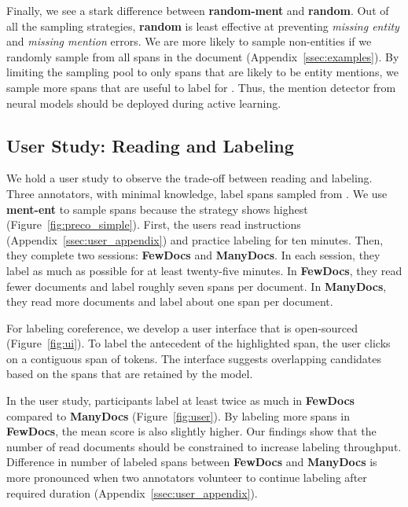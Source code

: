 Finally, we see a stark difference between \textbf{random-ment} and \textbf{random}.
Out of all the sampling strategies, \textbf{random} is least effective at preventing \emph{missing entity} and \emph{missing mention} errors.
We are more likely to sample non-entities if we randomly sample from all spans in the document (Appendix~\ref{ssec:examples}).
By limiting the sampling pool to only spans that are likely to be entity mentions, we sample more spans that are useful to label for \coref{}.  Thus, the mention detector from neural models should be deployed during active learning.




\subsection{User Study: Reading and Labeling}
\label{ssec:human_labeling}


We hold a user study to observe the trade-off between reading and labeling.
Three annotators, with minimal  knowledge, label spans
sampled from \preco{}. We use \textbf{ment-ent} to sample spans because the
strategy shows highest \avgfone{} (Figure~\ref{fig:preco_simple}).
First, the users read instructions (Appendix~\ref{ssec:user_appendix}) and practice labeling for
ten minutes.
Then, they complete two sessions: \textbf{FewDocs} and \textbf{ManyDocs}.
In each session, they label as much as possible for at least twenty-five
minutes.
In \textbf{FewDocs}, they read fewer documents and label roughly
seven spans per document.
In \textbf{ManyDocs}, they read more documents and label
about one span per document.

For labeling coreference, we develop a user interface that is open-sourced
(Figure~\ref{fig:ui}).
 To label the
 antecedent of
 the highlighted span, the user clicks on a contiguous span of tokens.
 The interface suggests
 overlapping candidates based on the spans that are retained by the \coref{}
 model.

In the user study, participants label at least twice as much
in \textbf{FewDocs} compared to \textbf{ManyDocs} (Figure~\ref{fig:user}).
By labeling more spans in \textbf{FewDocs}, the mean \avgfone{} score is also
slightly higher.
Our findings show that the number
of read documents should be constrained to increase labeling
throughput.
Difference in number of labeled spans between \textbf{FewDocs}
and \textbf{ManyDocs} is more pronounced when two annotators volunteer to continue labeling after required duration
(Appendix~\ref{ssec:user_appendix}).

